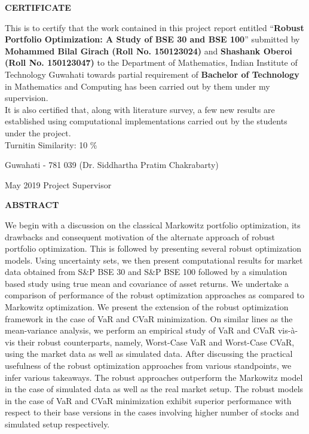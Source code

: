 \documentclass[12pt,a4paper]{report}
\theoremstyle{plain}
\theoremstyle{definition}
\theoremstyle{remark}
\begin{document}
\clearpage

 \setcounter{page}{2}
\begin{center}
{\Large{\bf{CERTIFICATE}}}
\end{center}


\noindent
This is to certify that the work contained in this project report entitled 
“\textbf{Robust Portfolio Optimization: A Study of BSE 30 and BSE 100}” submitted by \textbf{Mohammed Bilal Girach (Roll No. 150123024)} and \textbf{Shashank Oberoi (Roll No. 150123047)} 
to the Department of Mathematics, Indian Institute of Technology Guwahati towards partial requirement of
\textbf{Bachelor of Technology} in Mathematics and Computing has been carried out by them under
my supervision. \\

\noindent
It is also certified that, along with literature survey, a few new results are established using computational implementations carried out by the students under the project.\\

\noindent
Turnitin Similarity: 10 \%
%

\vspace{4cm}

\noindent Guwahati - 781 039 \hfill (Dr. Siddhartha Pratim Chakrabarty)

\noindent May 2019 \hfill Project Supervisor

\clearpage

\begin{center}
{\Large{\bf{ABSTRACT}}}
\end{center}


We begin with a discussion on the classical Markowitz portfolio optimization, its drawbacks and consequent motivation of the alternate approach of robust portfolio optimization. This is followed by presenting several robust optimization models. Using uncertainty sets, we then present computational results for market data obtained from S\&P BSE 30 and S\&P BSE 100 followed by a simulation based study using true mean and covariance of asset returns. We undertake a comparison of performance of the robust optimization approaches as compared to Markowitz optimization. We present the extension of the robust optimization framework in the case of VaR and CVaR minimization. On similar lines as the mean-variance analysis, we perform an empirical study of VaR and CVaR vis-\`a-vis their robust counterparts, namely, Worst-Case VaR and Worst-Case CVaR, using the market data as well as simulated data. After discussing the practical usefulness of the robust optimization approaches from various standpoints, we infer various takeaways. The robust approaches outperform the Markowitz model in the case of simulated data as well as the real market setup. The robust models in the case of VaR and CVaR minimization exhibit superior performance with respect to their base versions in the cases involving higher number of stocks and simulated setup respectively.
\end{document}
